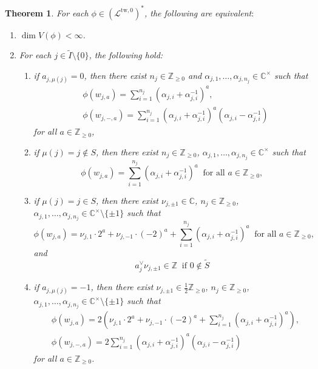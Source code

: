 \documentclass[12pt,a4paper]{amsart}
\newtheorem{thm}{Theorem}[subsection]
\theoremstyle{definition}
\numberwithin{equation}{subsection}
\begin{document}
\begin{thm}\label{thm: classification general}
  For each $\phi \in (\mathcal{L}^{\mathrm{tw},0})^*$, the following are equivalent$:$
  \begin{enumerate}
    \item $\dim V(\phi) < \infty$.
    \item For each $j \in \tilde{I} \setminus \{ 0 \}$, the following hold:
    \begin{enumerate}
      \item if $a_{j,\mu(j)} = 0$, then there exist $n_j \in \mathbb{Z}_{\geq 0}$ and $\alpha_{j,1},\dots,\alpha_{j,n_j} \in \mathbb{C}^\times$ such that
      \begin{align*}
        &\phi(w_{j,a}) = \sum_{i=1}^{n_j} (\alpha_{j,i}+\alpha_{j,i}^{-1})^a, \\
        &\phi(w_{j,-,a}) = \sum_{i=1}^{n_j} (\alpha_{j,i}+\alpha_{j,i}^{-1})^a(\alpha_{j,i}-\alpha_{j,i}^{-1})
      \end{align*}
      for all $a \in \mathbb{Z}_{\geq 0}$,
      \item if $\mu(j) = j \notin S$, then there exist $n_j \in \mathbb{Z}_{\geq 0}$, $\alpha_{j,1},\dots,\alpha_{j,n_j} \in \mathbb{C}^\times$ such that
      \[
        \phi(w_{j,a}) = \sum_{i=1}^{n_j} (\alpha_{j,i} + \alpha_{j,i}^{-1})^a \ \text{ for all } a \in \mathbb{Z}_{\geq 0},
      \]
      \item if $\mu(j) = j \in S$, then there exist $\nu_{j,\pm 1} \in \mathbb{C}$, $n_j \in \mathbb{Z}_{\geq 0}$, $\alpha_{j,1},\dots,\alpha_{j,n_j} \in \mathbb{C}^\times \setminus \{ \pm 1 \}$ such that
      \[
        \phi(w_{j,a}) = \nu_{j,1} \cdot 2^a + \nu_{j,-1} \cdot (-2)^a + \sum_{i=1}^{n_j} (\alpha_{j,i} + \alpha_{j,i}^{-1})^a \ \text{ for all } a \in \mathbb{Z}_{\geq 0},
      \]
      and
      \[
        a_j^\vee \nu_{j,\pm 1} \in \mathbb{Z} \  \text{ if } 0 \notin \tilde{S}
      \]
      \item if $a_{j,\mu(j)} = -1$, then there exist $\nu_{j,\pm 1} \in \frac{1}{2}\mathbb{Z}_{\geq 0}$, $n_j \in \mathbb{Z}_{\geq 0}$, $\alpha_{j,1},\dots,\alpha_{j,n_j} \in \mathbb{C}^\times \setminus \{ \pm 1 \}$ such that
      \begin{align*}
        &\phi(w_{j,a}) = 2(\nu_{j,1} \cdot 2^a + \nu_{j,-1} \cdot (-2)^a + \sum_{i=1}^{n_j} (\alpha_{j,i} + \alpha_{j,i}^{-1})^a), \\
        &\phi(w_{j,-,a}) = 2\sum_{i=1}^{n_j} (\alpha_{j,i} + \alpha_{j,i}^{-1})^a(\alpha_{j,i} - \alpha_{j,i}^{-1})
      \end{align*}
      for all $a \in \mathbb{Z}_{\geq 0}$.
    \end{enumerate}
  \end{enumerate}
\end{thm}
\end{document}
